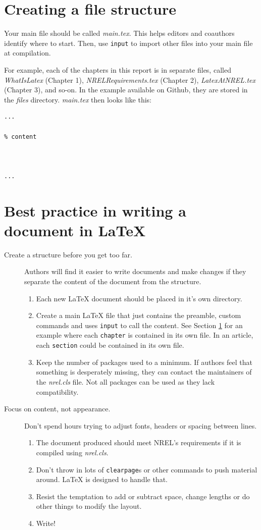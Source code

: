 \section{Creating a file structure}
\label{sec:FileStructure}
Your main file should be called \emph{main.tex}. This helps editors and coauthors identify where to start. Then, use \texttt{input} to import other files into your main file at compilation.

For example, each of the chapters in this report is in separate files, called \emph{WhatIsLatex} (Chapter 1), \emph{NRELRequirements.tex} (Chapter 2), \emph{LatexAtNREL.tex} (Chapter 3), and so-on. In the example available on Github, they are stored in the \emph{files} directory. \emph{main.tex} then looks like this:

\begin{lstlisting}
...

% content



...
\end{lstlisting}

\section{Best practice in writing a document in LaTeX}
\begin{description}
\item[Create a structure before you get too far.] Authors will find it easier to write documents and make changes if they separate the content of the document from the structure.
\begin{enumerate}
\item Each new LaTeX document should be placed in it's own directory. 
\item Create a main LaTeX file that just contains the preamble, custom commands and uses \texttt{input} to call the content. See Section \ref{sec:FileStructure} for an example where each \texttt{chapter} is contained in its own file. In an article, each \texttt{section} could be contained in its own file.
\item Keep the number of packages used to a minimum. If authors feel that something is desperately missing, they can contact the maintainers of the \emph{nrel.cls} file. Not all packages can be used as they lack compatibility.
\end{enumerate}
\item[Focus on content, not appearance.] Don't spend hours trying to adjust fonts, headers or spacing between lines. 
\begin{enumerate}
\item The document produced should meet NREL's requirements if it is compiled using \emph{nrel.cls}. 
\item Don't throw in lots of \texttt{clearpage}s or other commands to push material around. LaTeX is designed to handle that. 
\item Resist the temptation to add or subtract space, change lengths or do other things to modify the layout. 
\item Write!
\end{enumerate}
\end{description}
